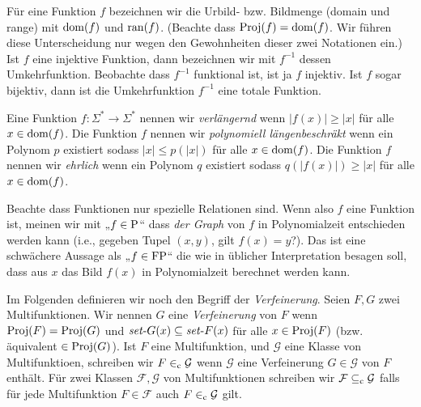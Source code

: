 Für eine Funktion $f$ bezeichnen wir die Urbild- bzw. Bildmenge (domain und range) mit $\dom(f)$ und $\ran(f)$. (Beachte dass $\Proj(f)=\dom(f)$. Wir führen diese Unterscheidung nur wegen den Gewohnheiten dieser zwei Notationen ein.) Ist $f$ eine injektive Funktion, dann bezeichnen wir mit $f^{-1}$ dessen Umkehrfunktion. Beobachte dass $f^{-1}$ funktional ist, ist ja $f$ injektiv. Ist $f$ sogar bijektiv, dann ist die Umkehrfunktion $f^{-1}$ eine totale Funktion.

Eine Funktion $f\colon\Sigma^*\to\Sigma^*$ nennen wir \emph{verlängernd} wenn $|f(x)|\geq |x|$ für alle $x\in\dom(f)$.
Die Funktion $f$ nennen wir \emph{polynomiell längenbeschräkt} wenn ein Polynom $p$ existiert sodass $|x|\leq p(|x|)$ für alle $x\in\dom(f)$.
Die Funktion $f$ nennen wir \emph{ehrlich} wenn ein Polynom $q$ existiert sodass $q(|f(x)|)\geq |x|$ für alle $x\in\dom(f)$.

Beachte dass Funktionen nur spezielle Relationen sind. Wenn also $f$ eine Funktion ist, meinen wir mit „$f\in\P$“ dass \emph{der Graph} von $f$ in Polynomialzeit entschieden werden kann (i.e., gegeben Tupel $(x, y)$, gilt $f(x)=y$?). Das ist eine schwächere Aussage als „$f\in\FP$“ die wie in üblicher Interpretation besagen soll, dass aus $x$ das Bild $f(x)$ in Polynomialzeit berechnet werden kann.

Im Folgenden definieren wir noch den Begriff der \emph{Verfeinerung}. Seien $F, G$ zwei Multifunktionen. Wir nennen $G$ eine \emph{Verfeinerung} von $F$ wenn $\Proj(F)=\Proj(G)$ und $\fset{}G(x)\subseteq \fset{}F(x)$ für alle $x\in\Proj(F)$ (bzw. äquivalent $\in \Proj(G)$).
Ist $F$ eine Multifunktion, und $\mathcal G$ eine Klasse von Multifunktioen, schreiben wir $F\inc \mathcal G$ wenn $\mathcal G$ eine Verfeinerung $G\in\mathcal G$ von $F$ enthält.
Für zwei Klassen $\mathcal F, \mathcal G$ von Multifunktionen schreiben wir $\mathcal F \subseteqc \mathcal G$ falls für jede Multifunktion $F\in\mathcal F$ auch $F\inc \mathcal G$ gilt.


